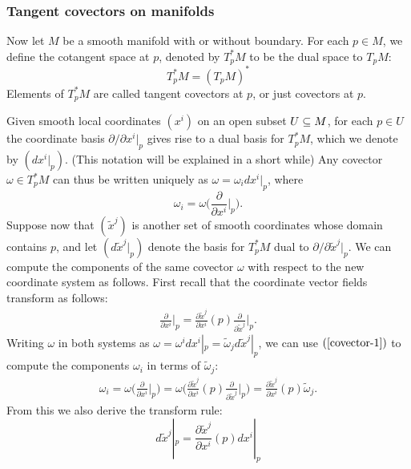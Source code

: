 \subsubsection{Tangent covectors on manifolds}
Now let $M$ be a smooth manifold with or without boundary. For each $p\in M$, we define the cotangent space at $p$, denoted by $T^*_pM$ to be the dual space to $T_pM$:
\[T^*_pM=(T_pM)^*\]
Elements of $T^*_pM$ are called tangent covectors at $p$, or just covectors at $p$.\par
Given smooth local coordinates $(x^i)$ on an open subset $U\subseteq M$, for each $p\in U$ the coordinate basis $\partial/\partial x^i|_p$ gives rise to a dual basis for $T^*_pM$, which we denote by $(dx^i|_p)$. (This notation will be explained in a short while) Any covector $\omega\in T^*_pM$ can thus be written uniquely as $\omega=\omega_idx^i|_p$, where
\[\omega_i=\omega\Big(\frac{\partial}{\partial x^i}\Big|_p\Big).\]
Suppose now that $(\widetilde{x}^j)$ is another set of smooth coordinates whose domain contains $p$, and let $(d\widetilde{x}^j|_p)$ denote the basis for $T^*_pM$ dual to $\partial/\partial\widetilde{x}^j|_p$. We can compute the components of the same covector $\omega$ with respect to the new coordinate system as follows. First recall that the coordinate vector fields transform as follows:
\begin{align}\label{covector-1}
\frac{\partial}{\partial x^i}\Big|_p=\frac{\partial\widetilde{x}^j}{\partial x^i}(p)\frac{\partial}{\partial\widetilde{x}^j}\Big|_p.
\end{align}
Writing $\omega$ in both systems as $\omega=\omega^idx^i|_p=\widetilde{\omega}_jd\widetilde{x}^j|_p$,
we can use $(\ref{covector-1})$ to compute the components $\omega_i$ in terms of $\widetilde{\omega}_j$:
\begin{align}\label{covector-2}
\omega_i=\omega\Big(\frac{\partial}{\partial x^i}\Big|_p\Big)=\omega\Big(\frac{\partial\widetilde{x}^j}{\partial x^i}(p)\frac{\partial}{\partial\widetilde{x}^j}\Big|_p\Big)=\frac{\partial\widetilde{x}^j}{\partial x^i}(p)\widetilde{\omega}_j.
\end{align}
From this we also derive the transform rule:
\[d\widetilde{x}^j|_p=\frac{\partial\widetilde{x}^j}{\partial x^i}(p)dx^i|_p\]
